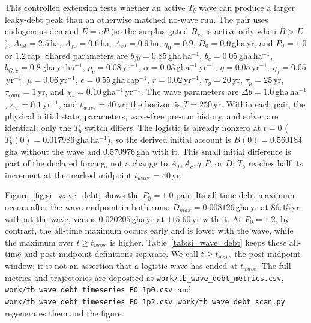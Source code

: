 This controlled extension tests whether an active $T_b$ wave can produce a larger leaky-debt peak than an otherwise matched no-wave run. The pair uses endogenous demand $E=eP$ (so the surplus-gated $R_{rc}$ is active only when $B>E$), $A_{tot}=2.5$\,ha, $A_{f0}=0.6$\,ha, $A_{c0}=0.9$\,ha, $q_0=0.9$, $D_0=0.0$\,gha\,yr, and $P_0=1.0$ or $1.2$\,cap. Shared parameters are $b_{f0}=0.85$\,gha\,ha$^{-1}$, $b_c=0.05$\,gha\,ha$^{-1}$, $b_{G,c}=0.8$\,gha\,yr\,ha$^{-1}$, $\rho_c=0.08$\,yr$^{-1}$, $\alpha=0.03$\,gha$^{-1}$\,yr$^{-1}$, $\eta=0.05$\,yr$^{-1}$, $\eta_f=0.05$\,yr$^{-1}$, $\mu=0.06$\,yr$^{-1}$, $e=0.55$\,gha\,cap$^{-1}$, $r=0.02$\,yr$^{-1}$, $\tau_g=20$\,yr, $\tau_p=25$\,yr, $\tau_{conv}=1$\,yr, and $\chi_r=0.10$\,gha$^{-1}$\,yr$^{-1}$. The wave parameters are $\Delta b=1.0$\,gha\,ha$^{-1}$, $\kappa_w=0.1$\,yr$^{-1}$, and $t_{wave}=40$\,yr; the horizon is $T=250$\,yr. Within each pair, the physical initial state, parameters, wave-free pre-run history, and solver are identical; only the $T_b$ switch differs. The logistic is already nonzero at $t=0$ ($T_b(0)=0.017986$\,gha\,ha$^{-1}$), so the derived initial account is $B(0)=0.560184$\,gha without the wave and $0.570976$\,gha with it. This small initial difference is part of the declared forcing, not a change to $A_f,A_c,q,P$, or $D$; $T_b$ reaches half its increment at the marked midpoint $t_{wave}=40$\,yr.

Figure~\ref{fig:si_wave_debt} shows the $P_0=1.0$ pair. Its all-time debt maximum occurs after the wave midpoint in both runs: $D_{max}=0.008126$\,gha\,yr at $86.15$\,yr without the wave, versus $0.020205$\,gha\,yr at $115.60$\,yr with it. At $P_0=1.2$, by contrast, the all-time maximum occurs early and is lower with the wave, while the maximum over $t\ge t_{wave}$ is higher. Table~\ref{tab:si_wave_debt} keeps these all-time and post-midpoint definitions separate. We call $t\ge t_{wave}$ the post-midpoint window; it is not an assertion that a logistic wave has ended at $t_{wave}$. The full metrics and trajectories are deposited as \texttt{work/tb\_wave\_debt\_metrics.csv}, \texttt{work/tb\_wave\_debt\_timeseries\_P0\_1p0.csv}, and \texttt{work/tb\_wave\_debt\_timeseries\_P0\_1p2.csv}; \texttt{work/tb\_wave\_debt\_scan.py} regenerates them and the figure.

